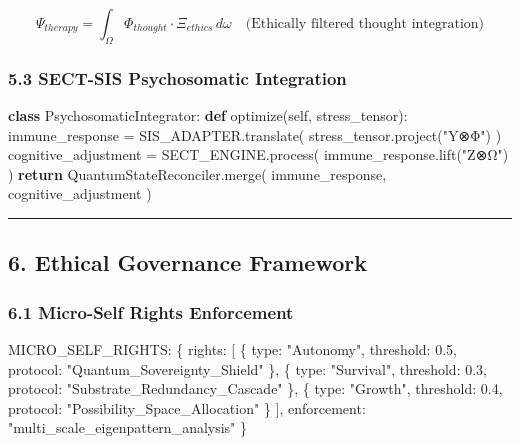 \documentclass[
]{article}
\newenvironment{Shaded}{}{}
\newcommand{\ControlFlowTok}[1]{\textcolor[rgb]{0.00,0.44,0.13}{\textbf{#1}}}
\newcommand{\KeywordTok}[1]{\textcolor[rgb]{0.00,0.44,0.13}{\textbf{#1}}}
\newcommand{\NormalTok}[1]{#1}
\newcommand{\OperatorTok}[1]{\textcolor[rgb]{0.40,0.40,0.40}{#1}}
\newcommand{\StringTok}[1]{\textcolor[rgb]{0.25,0.44,0.63}{#1}}
\newcommand{\VariableTok}[1]{\textcolor[rgb]{0.10,0.09,0.49}{#1}}
\begin{document}
\[
\Psi_{therapy} = \int_{\Omega} \Phi_{thought} \cdot \Xi_{ethics} \, d\omega \quad \text{(Ethically filtered thought integration)}
\]

\subsubsection{\texorpdfstring{\textbf{5.3 SECT-SIS Psychosomatic
Integration}}{5.3 SECT-SIS Psychosomatic Integration}}\label{sect-sis-psychosomatic-integration}

\begin{Shaded}
\begin{Highlighting}[]
\KeywordTok{class}\NormalTok{ PsychosomaticIntegrator:}
    \KeywordTok{def}\NormalTok{ optimize(}\VariableTok{self}\NormalTok{, stress\_tensor):}
\NormalTok{        immune\_response }\OperatorTok{=}\NormalTok{ SIS\_ADAPTER.translate(}
\NormalTok{            stress\_tensor.project(}\StringTok{"Y⊗Φ"}\NormalTok{)}
\NormalTok{        )}
\NormalTok{        cognitive\_adjustment }\OperatorTok{=}\NormalTok{ SECT\_ENGINE.process(}
\NormalTok{            immune\_response.lift(}\StringTok{"Z⊗Ω"}\NormalTok{)}
\NormalTok{        )}
        \ControlFlowTok{return}\NormalTok{ QuantumStateReconciler.merge(}
\NormalTok{            immune\_response, cognitive\_adjustment}
\NormalTok{        )}
\end{Highlighting}
\end{Shaded}

\begin{center}\rule{0.5\linewidth}{0.5pt}\end{center}

\subsection{\texorpdfstring{\textbf{6. Ethical Governance
Framework}}{6. Ethical Governance Framework}}\label{ethical-governance-framework}

\subsubsection{\texorpdfstring{\textbf{6.1 Micro-Self Rights
Enforcement}}{6.1 Micro-Self Rights Enforcement}}\label{micro-self-rights-enforcement}

\begin{Shaded}
\begin{Highlighting}[]
\NormalTok{MICRO\_SELF\_RIGHTS: \{}
\NormalTok{  rights: [}
\NormalTok{    \{ type: "Autonomy", threshold: 0.5, protocol: "Quantum\_Sovereignty\_Shield" \},}
\NormalTok{    \{ type: "Survival", threshold: 0.3, protocol: "Substrate\_Redundancy\_Cascade" \},}
\NormalTok{    \{ type: "Growth", threshold: 0.4, protocol: "Possibility\_Space\_Allocation" \}}
\NormalTok{  ],}
\NormalTok{  enforcement: "multi\_scale\_eigenpattern\_analysis"}
\NormalTok{\}}
\end{Highlighting}
\end{Shaded}
\end{document}
